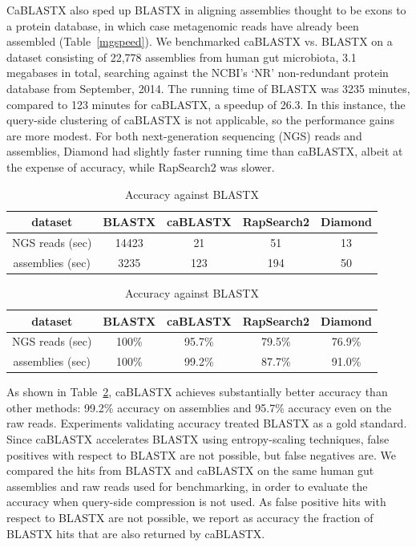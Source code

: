 \documentclass[review,preprint,12pt]{elsarticle}
\theoremstyle{definition}
\theoremstyle{remark}
\numberwithin{equation}{section}
\begin{document}
CaBLASTX also sped up BLASTX in aligning assemblies thought to be exons to a protein
database, in which case metagenomic reads have already been 
assembled (Table~\ref{mgspeed}).
We benchmarked caBLASTX vs. BLASTX on a dataset consisting of 22,778 assemblies
from human gut microbiota, 3.1 megabases in total, searching against the NCBI's
`NR' non-redundant protein database from September, 2014.
The running time of BLASTX was 3235 minutes, compared to 123 minutes for 
caBLASTX, a speedup of 26.3.
In this instance, the query-side clustering of caBLASTX is not applicable, so
the performance gains are more modest.
For both next-generation sequencing (NGS) reads and assemblies, Diamond had slightly faster running time than caBLASTX, albeit at the expense of accuracy, while RapSearch2 was slower.

\begin{table}
\caption{(a) Running time and (b) accuracy of BLASTX, caBLASTX, RapSearch2, and Diamond}
\begin{subtable}{1\textwidth}
\caption{Running time}
\label{mgspeed}
\begin{tabular}{ccccc}
\hline
dataset & BLASTX & caBLASTX & RapSearch2 & Diamond \\
\hline
NGS reads (sec) & 14423 & 21 & 51 & 13 \\
\hline
assemblies (sec) & 3235 & 123 & 194 & 50 \\
\hline
\end{tabular}
\end{subtable}

\begin{subtable}{1\textwidth}
\caption{Accuracy against BLASTX}
\label{mgacc}
\begin{tabular}{ccccc}
\hline
dataset & BLASTX & caBLASTX & RapSearch2 & Diamond \\
\hline
NGS reads (sec) & 100\% & 95.7\% & 79.5\% & 76.9\% \\
\hline
assemblies (sec) & 100\% & 99.2\% & 87.7\% & 91.0\% \\
\hline
\end{tabular}
\end{subtable}
\end{table}

As shown in Table~\ref{mgacc}, caBLASTX achieves substantially better accuracy
than other methods: 99.2\% accuracy on assemblies and 95.7\% 
accuracy even on the raw reads.
Experiments validating accuracy treated BLASTX as a gold standard. 
Since caBLASTX accelerates BLASTX
using entropy-scaling techniques, false positives with respect to BLASTX are 
not possible, but false negatives are.
We compared the hits from BLASTX and caBLASTX on the same human gut
assemblies and raw reads used for benchmarking, in order to evaluate the accuracy when
query-side compression is not used.
As false positive hits with respect to BLASTX are not possible, we report as 
accuracy the fraction of BLASTX hits that are also returned by caBLASTX.
\end{document}
